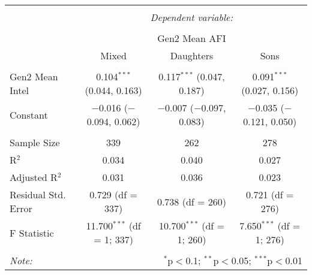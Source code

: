 
\begingroup 
\small 
\begin{tabular}{@{\extracolsep{1pt}}lccc} 
\\[-1.8ex]\hline 
\hline \\[-1.8ex] 
 & \multicolumn{3}{c}{\textit{Dependent variable:}} \\ 
\cline{2-4} 
\\[-1.8ex] & \multicolumn{3}{c}{Gen2 Mean AFI} \\ 
 & Mixed & Daughters & Sons \\ 
\hline \\[-1.8ex] 
 Gen2 Mean Intel & 0.104$^{***}$ (0.044, 0.163) & 0.117$^{***}$ (0.047, 0.187) & 0.091$^{***}$ (0.027, 0.156) \\ 
  Constant & $-$0.016 ($-$0.094, 0.062) & $-$0.007 ($-$0.097, 0.083) & $-$0.035 ($-$0.121, 0.050) \\ 
 \hline \\[-1.8ex] 
Sample Size & 339 & 262 & 278 \\ 
R$^{2}$ & 0.034 & 0.040 & 0.027 \\ 
Adjusted R$^{2}$ & 0.031 & 0.036 & 0.023 \\ 
Residual Std. Error & 0.729 (df = 337) & 0.738 (df = 260) & 0.721 (df = 276) \\ 
F Statistic & 11.700$^{***}$ (df = 1; 337) & 10.700$^{***}$ (df = 1; 260) & 7.650$^{***}$ (df = 1; 276) \\ 
\hline 
\hline \\[-1.8ex] 
\textit{Note:}  & \multicolumn{3}{r}{$^{*}$p$<$0.1; $^{**}$p$<$0.05; $^{***}$p$<$0.01} \\ 
\end{tabular} 
\endgroup 
